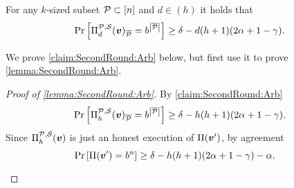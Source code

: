 \newcommand{\ds}{{d^\ast}}
\begin{claim}\label{claim:SecondRound:Arb}
For any $k$-sized subset $\mathcal{P}\subset [n]$ and $d\in (h)$ it holds that
\[
\Pr_{}\left[\Pi^{\mathcal{P},\mathcal{S}}_d({ \boldsymbol{v}})_{\overline{\mathcal{P}}} = b^{\left|{\overline{\mathcal{P}}}\right|}\right] \ge \delta- d (h+1)(2\alpha + 1-\gamma).
\]
\end{claim}
We prove \cref{claim:SecondRound:Arb} below, but first use it to prove \cref{lemma:SecondRound:Arb}.
 \begin{proof}[Proof of \cref{lemma:SecondRound:Arb}]
	By \cref{claim:SecondRound:Arb}
	\begin{align*}
	\Pr_{}\left[\Pi^{\mathcal{P},\mathcal{S}}_h({ \boldsymbol{v}})_{\overline{\mathcal{P}}} = b^{\left|{\overline{\mathcal{P}}}\right|}\right] \ge \delta - h(h+1)(2\alpha + 1-\gamma).
	\end{align*}
	Since $\Pi^{\mathcal{P},\mathcal{S}}_h({ \boldsymbol{v}})$ is just an honest execution of $\Pi({ \boldsymbol{v}}')$, by agreement
	\begin{align*}
	\Pr_{}\left[\Pi({ \boldsymbol{v}}') = b^n\right] &\ge \delta - h(h+1)(2\alpha + 1-\gamma) - \alpha.
	\end{align*}
\end{proof}




